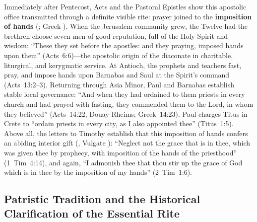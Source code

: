 Immediately after Pentecost, Acts and the Pastoral Epistles show this apostolic office transmitted through a definite visible rite: prayer joined to the \textbf{imposition of hands} (; Greek ). When the Jerusalem community grew, the Twelve had the brethren choose seven men of good reputation, full of the Holy Spirit and wisdom: ``These they set before the apostles: and they praying, imposed hands upon them'' (Acts~6:6)---the apostolic origin of the diaconate in charitable, liturgical, and kerygmatic service. At Antioch, the prophets and teachers fast, pray, and impose hands upon Barnabas and Saul at the Spirit's command (Acts~13:2--3). Returning through Asia Minor, Paul and Barnabas establish stable local governance: ``And when they had ordained to them priests in every church and had prayed with fasting, they commended them to the Lord, in whom they believed'' (Acts~14:22, Douay-Rheims; Greek~14:23). Paul charges Titus in Crete to ``ordain priests in every city, as I also appointed thee'' (Titus~1:5). Above all, the letters to Timothy establish that this imposition of hands confers an abiding interior gift (, Vulgate ): ``Neglect not the grace that is in thee, which was given thee by prophecy, with imposition of the hands of the priesthood'' (1~Tim~4:14), and again, ``I admonish thee that thou stir up the grace of God which is in thee by the imposition of my hands'' (2~Tim~1:6).

\subsection{Patristic Tradition and the Historical Clarification of the Essential Rite}
\label{subsec:orders-tradition}

